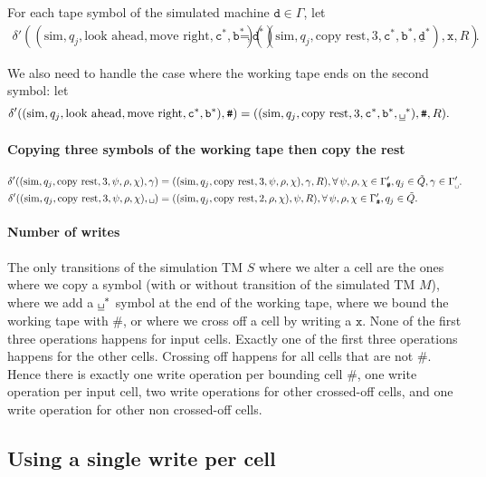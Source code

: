 \documentclass{article}
\newcommand{\obullet}[1]{\ensuremath{#1^*}}
\newcommand{\0}{\texttt{\textvisiblespace}}
\newcommand{\°}{\obullet{\0}}
\newcommand{\BB}{\obullet{\underline{\0}}}
\newcommand{\D}{\obullet{\d}}
\newcommand{\Q}{\obullet{\w}}
\renewcommand{\C}{\obullet{\y}}
\newcommand{\HD}{\obullet{\underline{\d}}}
\newcommand{\w}{\texttt{b}}
\newcommand{\y}{\texttt{c}}
\renewcommand{\d}{\texttt{d}}
\newcommand{\X}{\texttt{x}}
\newcommand{\e}{\texttt{\#}}
\newcommand{\TM}{TM}
\newcommand{\gpwb}{\Gamma'_{\0{}}}
\newcommand{\gpwe}{\Gamma'_{\e{}}}
\newcommand{\qwar}{\tilde{Q}}
\begin{document}
For each tape symbol of the simulated machine $\d \in \Gamma$,
let
\begin{align}
  \delta'((\text{sim}, q_j, \text{look ahead}, \text{move right}, \C, \Q),\D)
  &=((\text{sim}, q_j, \text{copy rest}, 3, \C, \Q, \HD), \X, R).
\end{align}

We also need to handle the case where the working tape ends on the second
symbol:
let
\begin{align}
  \delta'((\text{sim}, q_j, \text{look ahead}, \text{move right}, \C, \Q),\e)
  &=((\text{sim}, q_j, \text{copy rest}, 3, \C, \Q, \BB), \e, R).
\end{align}


\paragraph{Copying three symbols of the working tape then copy the rest}
\begin{align}
  \delta'((\text{sim}, q_j, \text{copy rest}, 3, \psi, \rho, \chi), \gamma)
  &= ((\text{sim}, q_j, \text{copy rest}, 3, \psi, \rho, \chi),
  \gamma, R),
  \forall\,
  \psi,\rho,\chi \in \gpwe,
  q_j \in \qwar,
  \gamma \in \gpwb.\\
  \delta'((\text{sim}, q_j, \text{copy rest}, 3, \psi, \rho, \chi), \0{})
  &= ((\text{sim}, q_j, \text{copy rest}, 2, \rho, \chi), \psi, R),
  \forall\,
  \psi,\rho,\chi \in \gpwe,
  q_j \in \qwar.
\end{align}

\paragraph{Number of writes}
The only transitions of the simulation \TM{} $S$ where we alter a cell are the
ones where we
copy a symbol (with or without transition of the simulated \TM{} $M$), where we add a
$\BB$ symbol at the end of the working tape, where we bound the working tape
with $\e$, or where we cross off a cell by writing a $\X$.
None of the first three operations happens for input cells.
Exactly one of the first three operations happens for the other
cells.
Crossing off happens for all cells that are not $\e$. Hence there is exactly
one write operation per bounding cell $\e$,
one write operation per input cell,
two write operations for other crossed-off cells,
and one write operation for other non crossed-off cells.

\subsection{Using a single write per cell}
\end{document}
